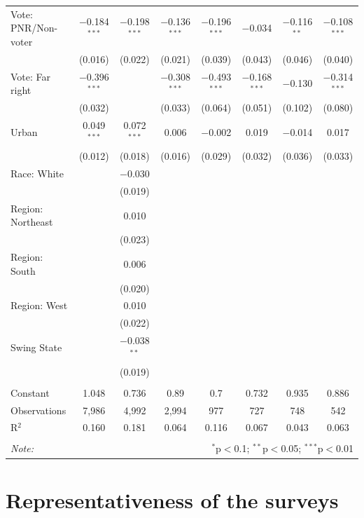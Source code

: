 \documentclass[12pt,english]{article}
\begin{document}
\begin{table}[h]
{{\begin{tabular}{@{\extracolsep{5pt}}lccccccc}
  Vote: PNR/Non-voter & $-$0.184$^{***}$ & $-$0.198$^{***}$ & $-$0.136$^{***}$ & $-$0.196$^{***}$ & $-$0.034 & $-$0.116$^{**}$ & $-$0.108$^{***}$ \\ 
  & (0.016) & (0.022) & (0.021) & (0.039) & (0.043) & (0.046) & (0.040) \\ 
  Vote: Far right & $-$0.396$^{***}$ &  & $-$0.308$^{***}$ & $-$0.493$^{***}$ & $-$0.168$^{***}$ & $-$0.130 & $-$0.314$^{***}$ \\ 
  & (0.032) &  & (0.033) & (0.064) & (0.051) & (0.102) & (0.080) \\ 
  Urban & 0.049$^{***}$ & 0.072$^{***}$ & 0.006 & $-$0.002 & 0.019 & $-$0.014 & 0.017 \\ 
  & (0.012) & (0.018) & (0.016) & (0.029) & (0.032) & (0.036) & (0.033) \\ 
  Race: White &  & $-$0.030 &  &  &  &  &  \\ 
  &  & (0.019) &  &  &  &  &  \\ 
  Region: Northeast &  & 0.010 &  &  &  &  &  \\ 
  &  & (0.023) &  &  &  &  &  \\ 
  Region: South &  & 0.006 &  &  &  &  &  \\ 
  &  & (0.020) &  &  &  &  &  \\ 
  Region: West &  & 0.010 &  &  &  &  &  \\ 
  &  & (0.022) &  &  &  &  &  \\ 
  Swing State &  & $-$0.038$^{**}$ &  &  &  &  &  \\ 
  &  & (0.019) &  &  &  &  &  \\ 
 \hline \\[-1.8ex] 
Constant & 1.048 & 0.736 & 0.89 & 0.7 & 0.732 & 0.935 & 0.886 \\ 
Observations & 7,986 & 4,992 & 2,994 & 977 & 727 & 748 & 542 \\ 
R$^{2}$ & 0.160 & 0.181 & 0.064 & 0.116 & 0.067 & 0.043 & 0.063 \\ 
\hline 
\hline \\[-1.8ex] 
\textit{Note:}  & \multicolumn{7}{r}{$^{*}$p$<$0.1; $^{**}$p$<$0.05; $^{***}$p$<$0.01} \\ 
\end{tabular}          }
    }
    {\footnotesize %
    }
\end{table}


\clearpage
\section{Representativeness of the surveys}\label{app:representativeness}
\end{document}
